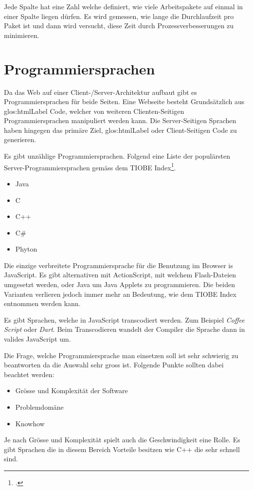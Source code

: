 Jede Spalte hat eine Zahl welche definiert, wie viele Arbeitspakete auf einmal in einer Spalte liegen dürfen. Es wird gemessen, wie lange die Durchlaufzeit pro Paket ist und dann wird versucht, diese Zeit durch Prozessverbesserungen zu minimieren. 

\section{Programmiersprachen}
Da das Web auf einer  Client-/Server-Architektur aufbaut gibt es Programmiersprachen für beide Seiten. Eine Webseite besteht Grundsätzlich aus \Gls{glos:htmlLabel} Code, welcher von weiteren Clienten-Seitigen Programmiersprachen manipuliert werden kann. Die Server-Seitigen Sprachen haben hingegen das primäre Ziel, \Gls{glos:htmlLabel} oder Client-Seitigen Code zu generieren.

Es gibt unzählige Programmiersprachen. Folgend eine Liste der populärsten Server-Programmiersprachen gemäss dem TIOBE Index\footcite{TIOBE_Software_Tiobe_Index_2015-06-04}.

\begin{itemize}
\item Java
\item C
\item C++
\item C\#
\item Phyton
\end{itemize}

Die einzige verbreitete Programmiersprache für die Benutzung im Browser is JavaScript. Es gibt alternativen mit ActionScript, mit welchem Flash-Dateien umgesetzt werden, oder Java um Java Applets zu programmieren. Die beiden Varianten verlieren jedoch immer mehr an Bedeutung, wie dem TIOBE Index entnommen werden kann.

Es gibt Sprachen, welche in JavaScript transcodiert werden. Zum Beispiel \textit{Coffee Script} oder \textit{Dart}. Beim Transcodieren wandelt der Compiler die Sprache dann in valides JavaScript um.

Die Frage, welche Programmiersprache man einsetzen soll ist sehr schwierig zu beantworten da die Auswahl sehr gross ist. Folgende Punkte sollten dabei beachtet werden:
\begin{itemize}
\item Grösse und Komplexität der Software
\item Problemdomäne
\item Knowhow
\end{itemize}
Je nach Grösse und Komplexität spielt auch die Geschwindigkeit eine Rolle. Es gibt Sprachen die in diesem Bereich Vorteile besitzen wie C++ die sehr schnell sind.

